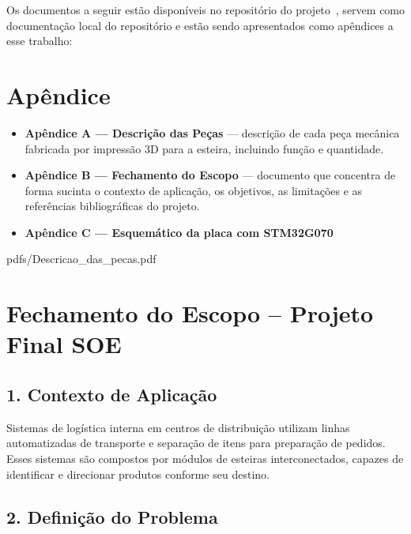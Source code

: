 Os documentos a seguir estão disponíveis no repositório do projeto~\cite{ref:github_soe}, servem como documentação local do repositório e estão sendo apresentados como apêndices a esse trabalho:
\section*{Apêndice}

\begin{itemize}

    \item \textbf{Apêndice A --- Descrição das Peças} --- descrição de cada peça mecânica fabricada por impressão 3D para a esteira, incluindo função e quantidade.

    \item \textbf{Apêndice B --- Fechamento do Escopo} --- documento que concentra de forma sucinta o contexto de aplicação, os objetivos, as limitações e as referências bibliográficas do projeto.

    \item \textbf{Apêndice C --- Esquemático da placa com STM32G070}

\end{itemize}


           {pdfs/Descricao_das_pecas.pdf}

\newpage

\section*{Fechamento do Escopo -- Projeto Final SOE}

\subsection*{1. Contexto de Aplicação}

Sistemas de logística interna em centros de distribuição utilizam linhas
automatizadas de transporte e separação de itens para preparação de pedidos.
Esses sistemas são compostos por módulos de esteiras interconectados, capazes
de identificar e direcionar produtos conforme seu destino.

\subsection*{2. Definição do Problema}

